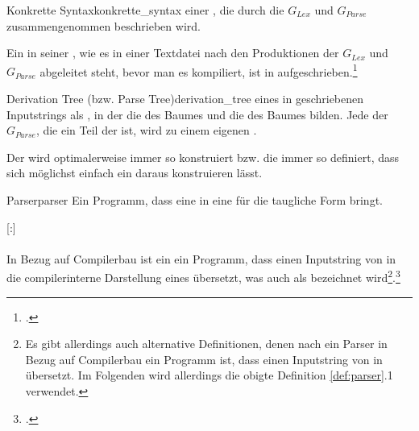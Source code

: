 \begin{Definition}{Konkrette Syntax}{konkrette_syntax}
   einer , die durch die  $G_{Lex}$ und $G_{Parse}$ zusammengenommen beschrieben wird.

  Ein  in seiner , wie es in einer Textdatei nach den Produktionen der  $G_{Lex}$ und $G_{Parse}$ abgeleitet steht, bevor man es kompiliert, ist in  aufgeschrieben.\footcite{noauthor_course_2022}
\end{Definition}

\begin{Definition}{Derivation Tree (bzw. Parse Tree)}{derivation_tree}
   eines in  geschriebenen Inputstrings als , in der  die  des Baumes und  die  des Baumes bilden. Jede  der  $G_{Parse}$, die ein Teil der  ist,  wird zu einem eigenen .

  Der  wird optimalerweise immer so konstruiert bzw. die  immer so definiert, dass sich möglichst einfach ein  daraus konstruieren lässt.


\end{Definition}

\begin{Definition}{Parser}{parser}
  Ein Programm, dass eine  in eine für die  taugliche Form bringt.

  \titleformat{\paragraph}[runin]{\normalfont\normalsize\bfseries}{}{0mm}{}[:]

  \paragraph{}\label{par:parser}\hspace{-0.25cm}
  In Bezug auf Compilerbau ist ein  ein Programm, dass einen Inputstring von  in die compilerinterne Darstellung eines  übersetzt, was auch als   bezeichnet wird\footnote{Es gibt allerdings auch alternative Definitionen, denen nach ein Parser in Bezug auf Compilerbau ein Programm ist, dass einen Inputstring von  in   übersetzt. Im Folgenden wird allerdings die obigte Definition \ref{def:parser}{.1} verwendet.}.\footcite{noauthor_compiler_nodate}
\end{Definition}

